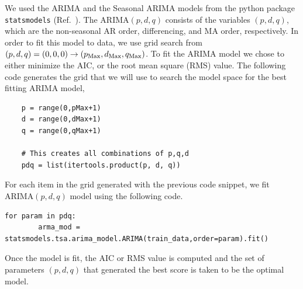 \documentclass[10pt,a4paper]{article}
\begin{document}
We used the ARIMA and the Seasonal ARIMA models from the python package \verb|statsmodels| (Ref.~\cite{Skipper_2010}). The ARIMA$(p,d,q)$ consists of the variables $(p,d,q)$, which are the non-seasonal AR order, differencing, and MA order, respectively. In order to fit this model to data, we use grid search from $(p,d,q)=(0,0,0) \rightarrow (p_{\rm Max},d_{\rm Max},q_{\rm Max}) $. To fit the ARIMA model we chose to either minimize the AIC, or the root mean square (RMS) value. The following code generates the grid that we will use to search the model space for the best fitting ARIMA model,
\begin{lstlisting}
	p = range(0,pMax+1)
	d = range(0,dMax+1)
	q = range(0,qMax+1)
	
	# This creates all combinations of p,q,d
	pdq = list(itertools.product(p, d, q))
\end{lstlisting}
For each item in the grid generated with the previous code snippet, we fit ARIMA$(p,d,q)$ model using the following code.
\begin{lstlisting}
for param in pdq:
		arma_mod = statsmodels.tsa.arima_model.ARIMA(train_data,order=param).fit()
\end{lstlisting}
Once the model is fit, the AIC or RMS value is computed and the set of parameters $(p,d,q)$ that generated the best score is taken to be the optimal model.\\
\end{document}
